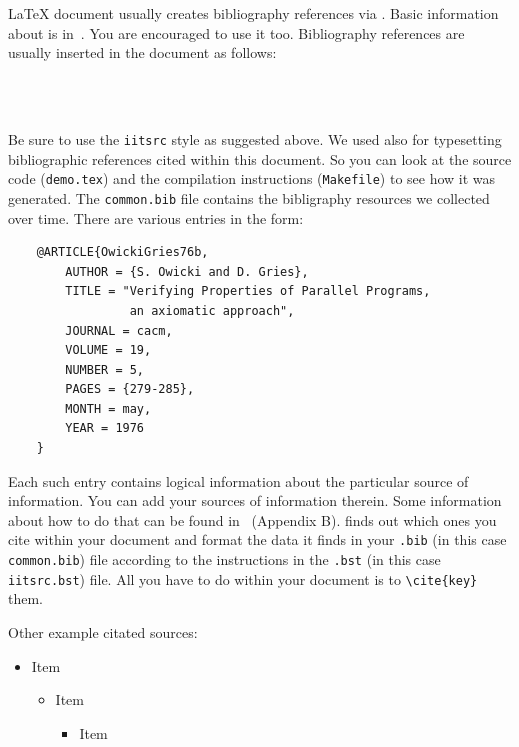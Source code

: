\documentclass{iitsrc}
\begin{document}
\LaTeX{} document usually creates bibliography references via \BibTeX.
Basic information about \BibTeX{} is in~\cite{lamport:latex}. You are
encouraged to use it too. Bibliography references are usually inserted
in the document as follows:
\begin{verbatim}
   
   
\end{verbatim}
Be sure to use the \verb|iitsrc| style as suggested above. We used \BibTeX{}
also for typesetting bibliographic references cited within this
document. So you can look at the source code ({\tt demo.tex}) and the
compilation instructions ({\tt Makefile}) to see how it was
generated. The {\tt common.bib} file contains the bibligraphy resources
we collected over time. There are various entries in the form:
\begin{verbatim}
    @ARTICLE{OwickiGries76b,
        AUTHOR = {S. Owicki and D. Gries},
        TITLE = "Verifying Properties of Parallel Programs,
                 an axiomatic approach",
        JOURNAL = cacm,
        VOLUME = 19,
        NUMBER = 5,
        PAGES = {279-285},
        MONTH = may,
        YEAR = 1976
    }
\end{verbatim}
Each such entry contains logical information about the particular source
of information. You can add your sources of information therein. Some
information about how to do that can be found in~\cite{lamport:latex}
(Appendix B).  \BibTeX{} finds out which ones you cite within your
document and format the data it finds in your {\tt *.bib} (in this case
{\tt common.bib}) file according to the instructions in the {\tt *.bst}
(in this case {\tt iitsrc.bst}) file. All you have to do within your
document is to \verb|\cite{key}| them.

Other example citated
sources:~\cite{CHS03RR,friedman:switching,henessy:computer,henrio:thesis,MannaPnueli82,MisraChandy,OwickiGries76b,vardhan98distributed,WidomPanangaden,C99-draft,czarnecki:generative-programming,SWIG,leiserson:network}

\begin{itemize}
\item Item
    \begin{itemize}
    \item Item
        \begin{itemize}
        \item Item
           
        \end{itemize}
    \end{itemize}
\end{itemize}
\end{document}
